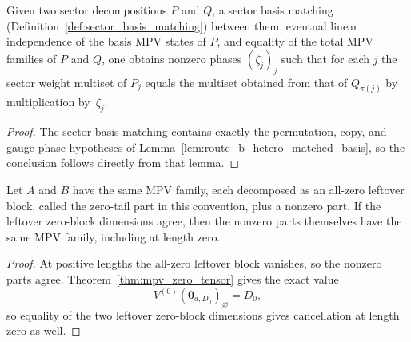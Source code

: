 \begin{theorem}%
\label{thm:route_b_hetero_sector_matching}
	\leanok
	Given two sector decompositions $P$ and $Q$, a sector basis matching
	(Definition~\ref{def:sector_basis_matching}) between them, eventual
	linear independence of the basis MPV states of $P$, and equality of the
	total MPV families of $P$ and $Q$, one obtains nonzero phases $(\zeta_j)_j$
	such that for each $j$ the sector weight multiset of $P_j$ equals the
	multiset obtained from that of $Q_{\pi(j)}$ by multiplication by~$\zeta_j$.
\end{theorem}

\begin{proof}
	\leanok
	The sector-basis matching contains exactly the permutation, copy, and
	gauge-phase hypotheses of Lemma~\ref{lem:route_b_hetero_matched_basis},
	so the conclusion follows directly from that lemma.
\end{proof}

\begin{lemma}\label{lem:sameMPV2_live_of_zeroTail_eq}
	\leanok
	Let $A$ and $B$ have the same MPV family, each decomposed as an all-zero
	leftover block, called the zero-tail part in this convention, plus a
	nonzero part. If the leftover zero-block dimensions agree, then the nonzero
	parts themselves have the same MPV family, including at length zero.
\end{lemma}

\begin{proof}
	\leanok
	At positive lengths the all-zero leftover block vanishes, so the nonzero
	parts agree. Theorem~\ref{thm:mpv_zero_tensor} gives the exact value
	\[
		V^{(0)}(\mathbf{0}_{d,D_0})_\varnothing=D_0,
	\]
	so equality of the two leftover zero-block dimensions gives cancellation
	at length zero as well.
\end{proof}

